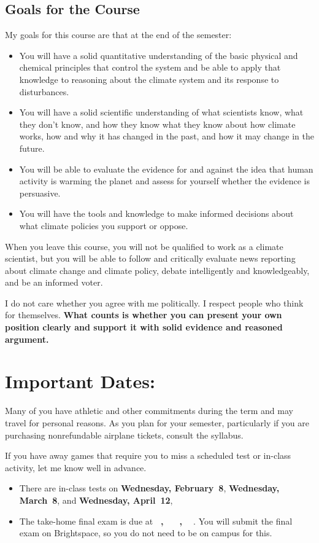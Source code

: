 \documentclass[11pt]{jgsyllabus}\usepackage[]{graphicx}\usepackage[]{xcolor}
\begin{document}
\subsection{Goals for the Course}

My goals for this course are that at the end of the semester:
\begin{itemize}
\item You will have a solid quantitative understanding of the basic physical and
  chemical principles that control the system and be able to apply that
  knowledge to reasoning about the climate system and its response to
  disturbances.
\item You will have a solid scientific understanding of what scientists know, what
  they don't know, and how they know what they know about how climate works,
  how and why it has changed in the past, and how it may change in the future.
\item You will be able to evaluate the evidence for and against the idea that human
  activity is warming the planet and assess for yourself whether the evidence
  is persuasive.
\item You will have the tools and knowledge to make informed decisions about what
  climate policies you support or oppose.
\end{itemize}

When you leave this course, you will not be qualified to work as a climate
scientist, but you will be able to follow and critically evaluate news
reporting about climate change and climate policy, debate intelligently and
knowledgeably, and be an informed voter.

I do not care whether you agree with me politically. I respect people who think
for themselves.
\textbf{What counts is whether you can present your own position clearly and support
it with solid evidence and reasoned argument.}
%
%
%
\section{Important Dates:}
Many of you have athletic and other commitments during the term and may travel for
personal reasons. As you plan for your semester, particularly if you are purchasing
nonrefundable airplane tickets, consult the syllabus.

If you have away games that require you to miss a scheduled test or in-class activity, let me know well in advance.
\begin{itemize}
\item There are in-class tests on
\textbf{Wednesday, February~8},
\textbf{Wednesday, March~8},
and
\textbf{Wednesday, April~12},
\item The take-home final exam is due at
\ifAltFinal
\textbf{\AltFinalExamEndTime~\AltFinalExamDay, \AltFinalExamMonth~\AltFinalExamDate}%
\else
\textbf{\FinalExamEndTime~\FinalExamDay, \FinalExamMonth~\FinalExamDate}%
\fi
.
You will submit the final exam on Brightspace, so you do not need to be on
campus for this.
\end{itemize}
%
%
%
%
%
\end{document}
